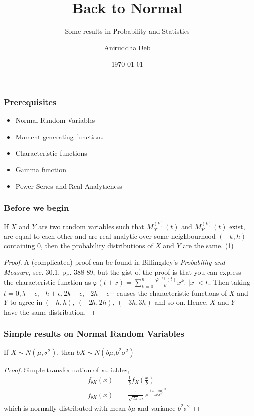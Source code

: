 \documentclass[10pt, aspectratio=169]{beamer}
\title{Back to Normal}
\subtitle{Some results in Probability and Statistics}
\author{Aniruddha Deb}
\institute{IIT Delhi}
\date{\today}
\theoremstyle{definition}
\begin{document}
\begin{frame}
\titlepage
\end{frame}

\begin{frame}[t]
\frametitle{Prerequisites}
\begin{itemize}
	\item<+-> Normal Random Variables
	\item<+-> Moment generating functions
	\item<+-> Characteristic functions
	\item<+-> Gamma function
	\item<+-> Power Series and Real Analyticness
\end{itemize}
\end{frame}

\begin{frame}
\frametitle{Before we begin}
\begin{theorem}
	If $X$ and $Y$ are two random variables such that $M_X^{(k)}(t)$ and $M_Y^{(k)}(t)$ exist, are equal to each other and are real analytic over some neighbourhood $(-h,h)$ containing 0, then the probability distributions of $X$ and $Y$ are the same. \hfill (1)
\end{theorem}
\pause
\begin{proof}
	A (complicated) proof can be found in Billingsley's \textit{Probability and Measure}, sec. 30.1, pp. 388-89, but the gist of the proof is that you can express the characteristic function as $\varphi(t+x) = \sum_{k=0}^n \frac{\varphi^{(k)}(t)}{k!}x^k,\ |x|<h$. Then taking $t = 0,h-\epsilon,-h+\epsilon,2h-\epsilon,-2h+\epsilon\cdots$ causes the characteristic functions of $X$ and $Y$ to agree in $(-h,h),\ (-2h,2h),\ (-3h,3h)$ and so on. Hence, $X$ and $Y$ have the same distribution.
\end{proof}
\end{frame}

\begin{frame}
\frametitle{Simple results on Normal Random Variables}
\begin{theorem}
	If $X \sim N(\mu, \sigma^2)$, then $bX \sim N(b\mu, b^2\sigma^2)$
\end{theorem}
\pause
\begin{proof}
	Simple transformation of variables; 
	\begin{align*}
	f_{bX}(x) &= \frac{1}{b}f_X\left( \frac{x}{b}\right) \\
	f_{bX}(x) &= \frac{1}{\sqrt{2\pi}b\sigma}\ e^{\frac{(x-b\mu)^2}{2b^2\sigma^2}}
	\end{align*}
	which is normally distributed with mean $b\mu$ and variance $b^2\sigma^2$
\end{proof}
\end{frame}
\end{document}
